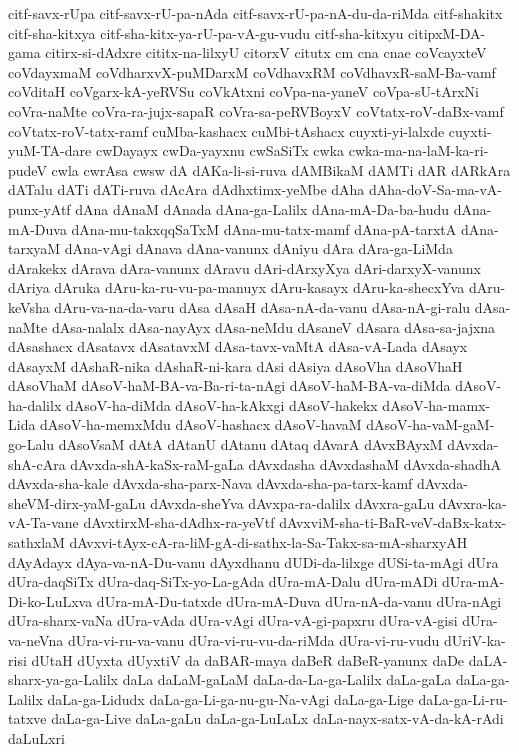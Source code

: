 {citf-savx-rUpa
citf-savx-rU-pa-nAda
citf-savx-rU-pa-nA-du-da-riMda
citf-shakitx
citf-sha-kitxya
citf-sha-kitx-ya-rU-pa-vA-gu-vudu
citf-sha-kitxyu
citipxM-DA-gama
citirx-si-dAdxre
cititx-na-lilxyU
citorxV
citutx
cm
cna
cnae
coVcayxteV
coVdayxmaM
coVdharxvX-puMDarxM
coVdhavxRM
coVdhavxR-saM-Ba-vamf
coVditaH
coVgarx-kA-yeRVSu
coVkAtxni
coVpa-na-yaneV
coVpa-sU-tArxNi
coVra-naMte
coVra-ra-jujx-sapaR
coVra-sa-peRVBoyxV
coVtatx-roV-daBx-vamf
coVtatx-roV-tatx-ramf
cuMba-kashacx
cuMbi-tAshacx
cuyxti-yi-lalxde
cuyxti-yuM-TA-dare
cwDayayx
cwDa-yayxnu
cwSaSiTx
cwka
cwka-ma-na-laM-ka-ri-pudeV
cwla
cwrAsa
cwsw
dA
dAKa-li-si-ruva
dAMBikaM
dAMTi
dAR
dARkAra
dATalu
dATi
dATi-ruva
dAcAra
dAdhxtimx-yeMbe
dAha
dAha-doV-Sa-ma-vA-punx-yAtf
dAna
dAnaM
dAnada
dAna-ga-Lalilx
dAna-mA-Da-ba-hudu
dAna-mA-Duva
dAna-mu-takxqqSaTxM
dAna-mu-tatx-mamf
dAna-pA-tarxtA
dAna-tarxyaM
dAna-vAgi
dAnava
dAna-vanunx
dAniyu
dAra
dAra-ga-LiMda
dArakekx
dArava
dAra-vanunx
dAravu
dAri-dArxyXya
dAri-darxyX-vanunx
dAriya
dAruka
dAru-ka-ru-vu-pa-manuyx
dAru-kasayx
dAru-ka-shecxYva
dAru-keVsha
dAru-va-na-da-varu
dAsa
dAsaH
dAsa-nA-da-vanu
dAsa-nA-gi-ralu
dAsa-naMte
dAsa-nalalx
dAsa-nayAyx
dAsa-neMdu
dAsaneV
dAsara
dAsa-sa-jajxna
dAsashacx
dAsatavx
dAsatavxM
dAsa-tavx-vaMtA
dAsa-vA-Lada
dAsayx
dAsayxM
dAshaR-nika
dAshaR-ni-kara
dAsi
dAsiya
dAsoVha
dAsoVhaH
dAsoVhaM
dAsoV-haM-BA-va-Ba-ri-ta-nAgi
dAsoV-haM-BA-va-diMda
dAsoV-ha-dalilx
dAsoV-ha-diMda
dAsoV-ha-kAkxgi
dAsoV-hakekx
dAsoV-ha-mamx-Lida
dAsoV-ha-memxMdu
dAsoV-hashacx
dAsoV-havaM
dAsoV-ha-vaM-gaM-go-Lalu
dAsoVsaM
dAtA
dAtanU
dAtanu
dAtaq
dAvarA
dAvxBAyxM
dAvxda-shA-cAra
dAvxda-shA-kaSx-raM-gaLa
dAvxdasha
dAvxdashaM
dAvxda-shadhA
dAvxda-sha-kale
dAvxda-sha-parx-Nava
dAvxda-sha-pa-tarx-kamf
dAvxda-sheVM-dirx-yaM-gaLu
dAvxda-sheYva
dAvxpa-ra-dalilx
dAvxra-gaLu
dAvxra-ka-vA-Ta-vane
dAvxtirxM-sha-dAdhx-ra-yeVtf
dAvxviM-sha-ti-BaR-veV-daBx-katx-sathxlaM
dAvxvi-tAyx-cA-ra-liM-gA-di-sathx-la-Sa-Takx-sa-mA-sharxyAH
dAyAdayx
dAya-va-nA-Du-vanu
dAyxdhanu
dUDi-da-lilxge
dUSi-ta-mAgi
dUra
dUra-daqSiTx
dUra-daq-SiTx-yo-La-gAda
dUra-mA-Dalu
dUra-mADi
dUra-mA-Di-ko-LuLxva
dUra-mA-Du-tatxde
dUra-mA-Duva
dUra-nA-da-vanu
dUra-nAgi
dUra-sharx-vaNa
dUra-vAda
dUra-vAgi
dUra-vA-gi-papxru
dUra-vA-gisi
dUra-va-neVna
dUra-vi-ru-va-vanu
dUra-vi-ru-vu-da-riMda
dUra-vi-ru-vudu
dUriV-ka-risi
dUtaH
dUyxta
dUyxtiV
da
daBAR-maya
daBeR
daBeR-yanunx
daDe
daLA-sharx-ya-ga-Lalilx
daLa
daLaM-gaLaM
daLa-da-La-ga-Lalilx
daLa-gaLa
daLa-ga-Lalilx
daLa-ga-Lidudx
daLa-ga-Li-ga-nu-gu-Na-vAgi
daLa-ga-Lige
daLa-ga-Li-ru-tatxve
daLa-ga-Live
daLa-gaLu
daLa-ga-LuLaLx
daLa-nayx-satx-vA-da-kA-rAdi
daLuLxri
}
